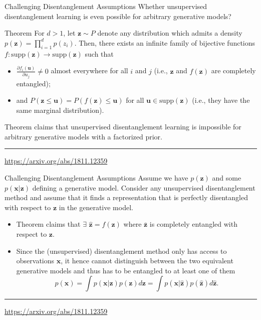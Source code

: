 \documentclass{beamer}
\newcommand{\bu}{\mathbf{u}}
\newcommand{\bx}{\mathbf{x}}
\newcommand{\bz}{\mathbf{z}}
\begin{document}
\begin{frame}{Challenging Disentanglement Assumptions}
	Whether unsupervised disentanglement learning is even possible for arbitrary generative models?
	
	\begin{block}{Theorem}
		For $d > 1$, let $\bz \sim P$ denote any distribution which admits a density $p(\bz) = \prod^d_{i=1} p(z_i)$. Then, there exists an infinite family of bijective functions $f : \text{supp}(\bz) \rightarrow \text{supp}(\bz)$ such that
		\begin{itemize}
			\item $\frac{\partial f_i(\bu)}{\partial u_j} \neq 0$ almost everywhere for all $i$ and $j$ (i.e., $\bz$ and $f(\bz)$ are completely entangled);
			\item and $P(\bz \leq \bu) = P(f(\bz) \leq \bu)$ for all $\bu \in \text{supp}(\bz)$ (i.e., they
			have the same marginal distribution).
		\end{itemize}  
	\end{block}

	Theorem claims that unsupervised disentanglement learning is impossible for arbitrary generative models with a factorized prior.
	
	\vfill
	\hrule\medskip
	{\scriptsize \href{https://arxiv.org/abs/1811.12359}{https://arxiv.org/abs/1811.12359}}
\end{frame}
\begin{frame}{Challenging Disentanglement Assumptions}
	Assume we have $p(\bz)$ and some $p(\bx|\bz)$ defining a generative model. Consider any unsupervised
	disentanglement method and assume that it finds a representation that is perfectly disentangled with respect
	to $\bz$ in the generative model.
	\begin{itemize}
		\item Theorem claims that $\exists$ $\hat{\bz} = f(\bz)$ where $\bar{\bz}$ is completely entangled
		with respect to $\bz$.
		\item Since the (unsupervised) disentanglement method only has access to
		observations $\bx$, it hence cannot distinguish between the two equivalent generative models and thus has to be entangled to at least one of them
		\[
			p(\bx) = \int p(\bx | \bz) p(\bz) d\bz = \int p(\bx | \hat{\bz})p(\hat{\bz}) d \hat{\bz}.
		\]
	\end{itemize}
	
	\vfill
	\hrule\medskip
	{\scriptsize \href{https://arxiv.org/abs/1811.12359}{https://arxiv.org/abs/1811.12359}}
\end{frame}
\end{document}

